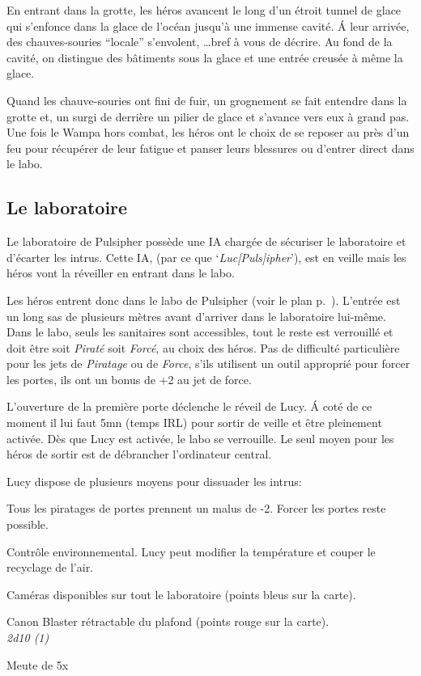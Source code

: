 En entrant dans la grotte, les héros avancent le long d’un étroit tunnel de glace qui s’enfonce dans la glace de l’océan jusqu’à une immense cavité. \'A leur arrivée, des chauves-souries “locale” s’envolent, \ldots bref à vous de décrire. Au fond de la cavité, on distingue des bâtiments sous la glace et une entrée creusée à même la glace.

Quand les chauve-souries ont fini de fuir, un grognement se fait entendre dans la grotte et, un  surgi de derrière un pilier de glace et s’avance vers eux à grand pas.\\

Une fois le Wampa hors combat, les héros ont le choix de se reposer au près d’un feu pour récupérer de leur fatigue et panser leurs blessures ou d’entrer direct dans le labo.

\subsection{Le laboratoire}

Le laboratoire de Pulsipher possède une IA chargée de sécuriser le laboratoire et d’écarter les intrus. Cette IA,  (par ce que ‘\emph{Luc[Puls]ipher}’), est en veille mais les héros vont la réveiller en entrant dans le labo. 

Les héros entrent donc dans le labo de Pulsipher (voir le plan p.~\pageref{sec:plan-labo-pulsipher}). L’entrée est un long sas de plusieurs mètres avant d’arriver dans le laboratoire lui-même. Dans le labo, seuls les sanitaires sont accessibles, tout le reste est verrouillé et doit être soit \textit{Piraté} soit \textit{Forcé}, au choix des héros. Pas de difficulté particulière pour les jets de \textit{Piratage} ou de \textit{Force}, s’ils utilisent un outil approprié pour forcer les portes, ils ont un bonus de +2 au jet de force.

L’ouverture de la première porte déclenche le réveil de Lucy. \'A coté de ce moment il lui faut 5mn (temps IRL) pour sortir de veille et être pleinement activée. Dès que Lucy est activée, le labo se verrouille. Le seul moyen pour les héros de sortir est de débrancher l’ordinateur central.

Lucy dispose de plusieurs moyens pour dissuader les intrus:
\begin{rebelist}
    \item Tous les piratages de portes prennent un malus de -2. Forcer les portes reste possible.
    \item Contrôle environnemental. Lucy peut modifier la température et couper le recyclage de l’air.
    \item Caméras disponibles sur tout le laboratoire (points bleus sur la carte).
    \item Canon Blaster rétractable du plafond (points rouge sur la carte).\\
        \textit{2d10 (1)}
    \item Meute de 5x 
\end{rebelist}

